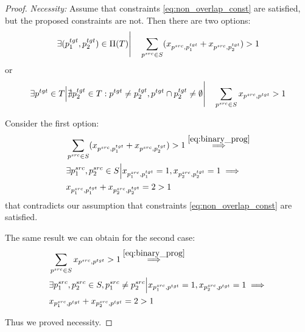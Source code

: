 \begin{proof}
    \textit{Necessity:} Assume that constraints \eqref{eq:non_overlap_const} are satisfied, but
    the proposed constraints are not. Then there are two options:
    \[
        \exists (p_1^{tgt}, p_2^{tgt}) \in \Pi(T) \Bigg| \quad
        \sum\limits_{p^{src} \in S} (x_{p^{src}, p_1^{tgt}} + x_{p^{src}, p_2^{tgt}}) > 1
    \]
    or
    \[
        \exists p^{tgt} \in T \Big|
        \nexists p_2^{tgt} \in T: p^{tgt} \neq p_2^{tgt}, p^{tgt} \cap p_2^{tgt} \neq \emptyset
        \Bigg| \quad \sum\limits_{p^{src} \in S} x_{p^{src}, p^{tgt}} > 1
    \]

    Consider the first option:
    \begin{align*}
         & \sum\limits_{p^{src} \in S} (x_{p^{src}, p_1^{tgt}} + x_{p^{src}, p_2^{tgt}}) > 1
        \stackrel{\eqref{eq:binary_prog}}{\implies}                                                                     \\
         & \exists p_1^{src}, p_2^{src} \in S \Big| x_{p_1^{src}, p_1^{tgt}} = 1, x_{p_2^{src}, p_2^{tgt}} = 1 \implies \\
         & x_{p_1^{src}, p_1^{tgt}} + x_{p_2^{src}, p_2^{tgt}} = 2 > 1
    \end{align*}
    that contradicts our assumption that constraints \eqref{eq:non_overlap_const} are satisfied.

    The same result we can obtain for the second case:
    \begin{align*}
         & \sum\limits_{p^{src} \in S} x_{p^{src}, p^{tgt}} > 1
        \stackrel{\eqref{eq:binary_prog}}{\implies}                                                                                           \\
         & \exists p_1^{src}, p_2^{src} \in S, p_1^{src} \neq p_2^{src} \Big| x_{p_1^{src}, p^{tgt}} = 1, x_{p_2^{src}, p^{tgt}} = 1 \implies \\
         & x_{p_1^{src}, p^{tgt}} + x_{p_2^{src}, p^{tgt}} = 2 > 1
    \end{align*}

    Thus we proved necessity.


\end{proof}
